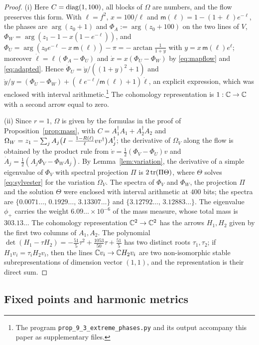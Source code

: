 \begin{proof}
(i) Here $C=\operatorname{diag}(1,100)$, all blocks of $\Omega$ are numbers, and the
flow preserves this form. With $\ell=f^2$, $x=100/\ell$ and
$\mathsf m(\ell)=1-(1+\ell)e^{-\ell}$, the phases are $\arg(z_0+1)$ and
$\Phi_A:=\arg(z_0+100)$ on the two lines of $V$,
$\Phi_W=\arg(z_1-1-x(1-e^{-\ell}))$, and
$\Phi_U=\arg(z_0e^{-\ell}-x\,\mathsf m(\ell))-\pi=-\arctan\frac1{1+y}$ with
$y=x\,\mathsf m(\ell)e^\ell$; moreover $\dot\ell=\ell(\Phi_A-\Phi_U)$ and
$\dot x=x(\Phi_U-\Phi_W)$ by \eqref{eq:mapflow} and \eqref{eq:adapted}. Hence
$\dot\Phi_U=\dot y/((1+y)^2+1)$ and
$\dot y/y=(\Phi_U-\Phi_W)+(\ell e^{-\ell}/\mathsf m(\ell)+1)\dot\ell$, an
explicit expression, which was enclosed with interval
arithmetic.\footnote{The program \texttt{prop\_9\_3\_extreme\_phases.py} and
its output accompany this paper as supplementary files.} The cohomology
representation is $1:\mathbb C\to\mathbb C$ with a second arrow equal to zero.

(ii) Since $r=1$, $\Omega$ is given by the formulas in the proof of
Proposition~\ref{prop:mass}, with $C=A_1^\dagger A_1+A_2^\dagger A_2$ and
$\Omega_W=z_1-\sum_jA_j\bigl(I-\tfrac{1-R(\ell)}\ell vv^\dagger\bigr)A_j^\dagger$;
the derivative of $\Omega_V$ along the flow is obtained by the product rule
from $\dot v=\frac12(\Phi_V-\Phi_U)v$ and
$\dot A_j=\frac12(A_j\Phi_V-\Phi_WA_j)$. By Lemma~\ref{lem:variation}, the
derivative of a simple eigenvalue of $\Phi_V$ with spectral projection $\Pi$
is $2\operatorname{tr}(\Pi\Theta)$, where $\Theta$ solves \eqref{eq:sylvester} for the
variation $\dot\Omega_V$. The spectra of $\Phi_V$ and $\Phi_W$, the
projection $\Pi$ and the solution $\Theta$ were enclosed with interval
arithmetic at $400$ bits; the spectra are
$\{0.0071\ldots,\,0.1929\ldots,\,3.13307\ldots\}$ and
$\{3.12792\ldots,\,3.12883\ldots\}$. The eigenvalue $\phi_+$ carries the
weight $6.09\ldots\times10^{-6}$ of the mass measure, whose total mass is
$303.13\ldots$ The cohomology representation $\mathbb C^2\to\mathbb C^2$ has the arrows
$H_1,H_2$ given by the first two columns of $A_1,A_2$. The polynomial
$\det(H_1-\tau H_2)=-\frac{51}5\tau^2+\frac{1053}{50}\tau+\frac{51}5$ has two
distinct roots $\tau_1,\tau_2$; if $H_1v_i=\tau_iH_2v_i$, then the lines
$\mathbb C v_i\to\mathbb C H_2v_i$ are two non-isomorphic stable subrepresentations of
dimension vector $(1,1)$, and the representation is their direct sum.
\end{proof}

\subsection{Fixed points and harmonic metrics}


